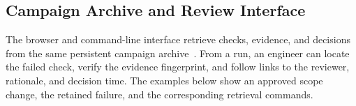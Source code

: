 \subsection{Campaign Archive and Review Interface}
\label{sec:interface}
\label{sec:retrieval}
The browser and command-line interface retrieve checks, evidence, and decisions from the same persistent campaign archive~\cite{scpCheckpoint}. From a run, an engineer can locate the failed check, verify the evidence fingerprint, and follow links to the reviewer, rationale, and decision time. The examples below show an approved scope change, the retained failure, and the corresponding retrieval commands.
